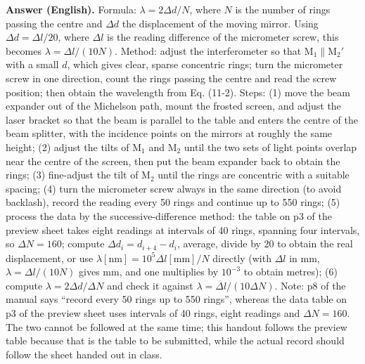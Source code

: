 \documentclass[11pt]{ctexart}
\newcommand{\Dl}{d}
\newcommand{\qaneed}[1]{\needspace{#1\textheight}}
\begin{document}
\textbf{Answer (English).} Formula: $\lambda=2\Delta\Dl/N$, where $N$ is the number of rings passing the centre and $\Delta\Dl$ the displacement of the moving mirror. Using $\Delta\Dl=\Delta l/20$, where $\Delta l$ is the reading difference of the micrometer screw, this becomes $\lambda=\Delta l/(10N)$.
Method: adjust the interferometer so that M$_1\parallel$M$_2'$ with a small $\Dl$, which gives clear, sparse concentric rings; turn the micrometer screw in one direction, count the rings passing the centre and read the screw position; then obtain the wavelength from Eq. (11-2).
Steps: (1) move the beam expander out of the Michelson path, mount the frosted screen, and adjust the laser bracket so that the beam is parallel to the table and enters the centre of the beam splitter, with the incidence points on the mirrors at roughly the same height; (2) adjust the tilts of M$_1$ and M$_2$ until the two sets of light points overlap near the centre of the screen, then put the beam expander back to obtain the rings; (3) fine-adjust the tilt of M$_2$ until the rings are concentric with a suitable spacing; (4) turn the micrometer screw always in the same direction (to avoid backlash), record the reading every 50 rings and continue up to 550 rings; (5) process the data by the successive-difference method: the table on p3 of the preview sheet takes eight readings at intervals of 40 rings, spanning four intervals, so $\Delta N=160$; compute $\Delta\Dl_i=\Dl_{i+4}-\Dl_i$, average, divide by 20 to obtain the real displacement, or use $\lambda[\mathrm{nm}]=10^{5}\Delta l[\mathrm{mm}]/N$ directly (with $\Delta l$ in mm, $\lambda=\Delta l/(10N)$ gives mm, and one multiplies by $10^{-3}$ to obtain metres); (6) compute $\lambda=2\Delta\Dl/\Delta N$ and check it against $\lambda=\Delta l/(10\Delta N)$.
Note: p8 of the manual says ``record every 50 rings up to 550 rings'', whereas the data table on p3 of the preview sheet uses intervals of 40 rings, eight readings and $\Delta N=160$. The two cannot be followed at the same time; this handout follows the preview table because that is the table to be submitted, while the actual record should follow the sheet handed out in class.

\qaneed{0.68}

\end{document}
